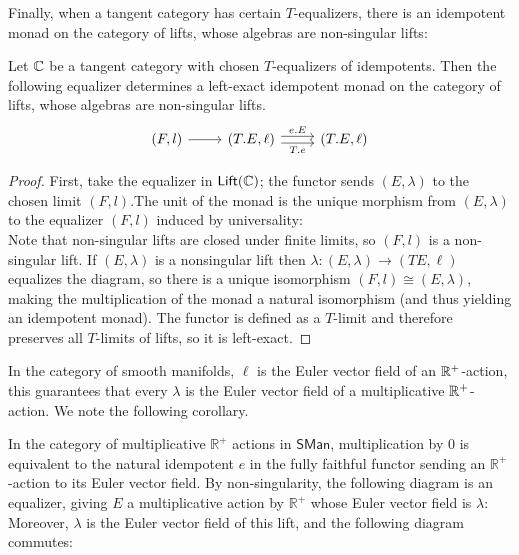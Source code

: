 Finally, when a tangent category has certain $T$-equalizers, there is an idempotent monad on the category of lifts, whose algebras are non-singular lifts:
\begin{theorem}%
  \label{thm:idemp-monad-nonsingular}
  Let $\mathbb{C}$ be a tangent category with chosen $T$-equalizers of idempotents. Then the following equalizer determines a left-exact idempotent monad on the category of lifts, whose algebras are non-singular lifts.
\[\begin{tikzcd}
	{(F,l)} & {(T.E,\ell)} & {(T.E, \ell)}
	\arrow[from=1-1, to=1-2]
	\arrow["{e.E}", shift left=1, from=1-2, to=1-3]
	\arrow["{T.e}"', shift right=1, from=1-2, to=1-3]
\end{tikzcd}\] 
\end{theorem}
\begin{proof}
  First, take the equalizer in $\mathsf{Lift}(\mathbb{C})$; the functor sends $(E,\lambda)$ to the chosen limit $(F,l)$.The unit of the monad is the unique morphism from $(E,\lambda)$ to the equalizer $(F,l)$ induced by universality:
  \[\]
  Note that non-singular lifts are closed under finite limits, so $(F,l)$ is a non-singular lift. If $(E,\lambda)$ is a nonsingular lift then $\lambda: (E,\lambda) \to (TE, \ell)$ equalizes the diagram, so there is a unique isomorphism $(F,l) \cong (E,\lambda)$, making the multiplication of the monad a natural isomorphism (and thus yielding an idempotent monad).
  The functor is defined as a $T$-limit and therefore preserves all $T$-limits of lifts, so it is left-exact.
\end{proof}
In the category of smooth manifolds, $\ell$ is the Euler vector field of an $\mathbb{R}^+$-action, this guarantees that every $\lambda$ is the Euler vector field of a multiplicative $\mathbb{R}^+$-action.  We note the following corollary.
\begin{corollary}%
  \label{cor:non-singular-implies-ract}
  In the category of multiplicative $\mathbb{R}^+$ actions in $\mathsf{SMan}$, multiplication by $0$ is equivalent to the natural idempotent $e$ in the fully faithful functor sending an $\mathbb{R}^+$-action to its Euler vector field. By non-singularity, the following diagram is an equalizer, giving $E$ a multiplicative action by $\mathbb{R}^+$ whose Euler vector field is $\lambda$: 
  \[
    
  \]
  Moreover, $\lambda$ is the Euler vector field of this lift, and the following diagram commutes:
  \[
    
  \]
\end{corollary}
